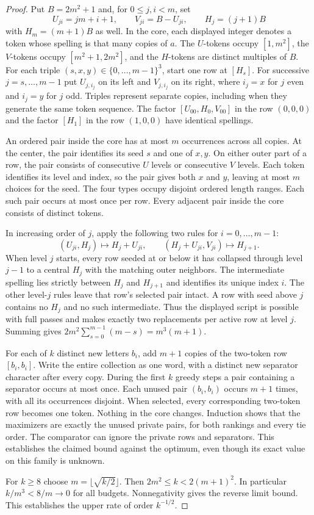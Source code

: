\documentclass[11pt]{article}
\begin{document}
\begin{proof}
Put $B=2m^2+1$ and, for $0\le j,i<m$, set
\[
 U_{ji}=jm+i+1,\qquad V_{ji}=B-U_{ji},\qquad H_j=(j+1)B
\]
with $H_m=(m+1)B$ as well. In the core, each displayed integer denotes a token whose spelling is that many copies of $a$. The $U$-tokens occupy $[1,m^2]$, the $V$-tokens occupy $[m^2+1,2m^2]$, and the $H$-tokens are distinct multiples of $B$. For each triple $(s,x,y)\in\{0,\ldots,m-1\}^3$, start one row at $[H_s]$. For successive $j=s,\ldots,m-1$ put $U_{j,i_j}$ on its left and $V_{j,i_j}$ on its right, where $i_j=x$ for $j$ even and $i_j=y$ for $j$ odd. Triples represent separate copies, including when they generate the same token sequence. The factor $[U_{00},H_0,V_{00}]$ in the row $(0,0,0)$ and the factor $[H_1]$ in the row $(1,0,0)$ have identical spellings.

An ordered pair inside the core has at most $m$ occurrences across all copies. At the center, the pair identifies its seed $s$ and one of $x,y$. On either outer part of a row, the pair consists of consecutive $U$ levels or consecutive $V$ levels. Each token identifies its level and index, so the pair gives both $x$ and $y$, leaving at most $m$ choices for the seed. The four types occupy disjoint ordered length ranges. Each such pair occurs at most once per row. Every adjacent pair inside the core consists of distinct tokens.

In increasing order of $j$, apply the following two rules for $i=0,\ldots,m-1$:
\[
  (U_{ji},H_j)\longmapsto H_j+U_{ji},\qquad
  (H_j+U_{ji},V_{ji})\longmapsto H_{j+1}.
\]
When level $j$ starts, every row seeded at or below it has collapsed through level $j-1$ to a central $H_j$ with the matching outer neighbors. The intermediate spelling lies strictly between $H_j$ and $H_{j+1}$ and identifies its unique index $i$. The other level-$j$ rules leave that row's selected pair intact. A row with seed above $j$ contains no $H_j$ and no such intermediate. Thus the displayed script is possible with full passes and makes exactly two replacements per active row at level $j$. Summing gives $2m^2\sum_{s=0}^{m-1}(m-s)=m^3(m+1)$.

For each of $k$ distinct new letters $b_i$, add $m+1$ copies of the two-token row $[b_i,b_i]$. Write the entire collection as one word, with a distinct new separator character after every copy. During the first $k$ greedy steps a pair containing a separator occurs at most once. Each unused pair $(b_i,b_i)$ occurs $m+1$ times, with all its occurrences disjoint. When selected, every corresponding two-token row becomes one token. Nothing in the core changes. Induction shows that the maximizers are exactly the unused private pairs, for both rankings and every tie order. The comparator can ignore the private rows and separators. This establishes the claimed bound against the optimum, even though its exact value on this family is unknown.

For $k\ge8$ choose $m=\lfloor\sqrt{k/2}\rfloor$. Then $2m^2\le k<2(m+1)^2$. In particular $k/m^3<8/m\to0$ for all budgets. Nonnegativity gives the reverse limit bound. This establishes the upper rate of order $k^{-1/2}$.
\end{proof}
\end{document}
